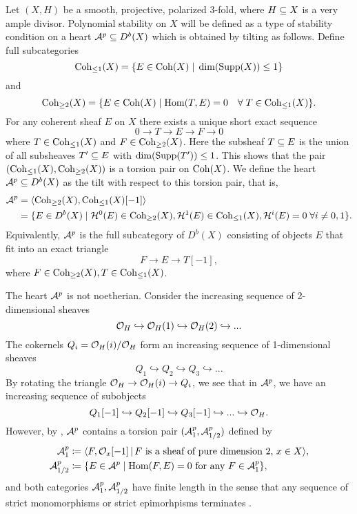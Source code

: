 Let $(X, H)$ be a smooth, projective, polarized 3-fold, where $H \subseteq X$ is a very ample divisor. Polynomial stability on $X$ will be defined as a type of stability condition on a heart $\mathcal{A}^p \subseteq D^b(X)$ which is obtained by tilting as follows. Define full subcategories
\[ \operatorname{\mathrm{Coh}}_{\le 1}(X) = \{ E \in \operatorname{\mathrm{Coh}}(X) \;|\; \dim(\operatorname{\mathrm{Supp}}(X)) \le 1 \} \]
and
\[ \operatorname{\mathrm{Coh}}_{\ge 2}(X) = \{ E \in \operatorname{\mathrm{Coh}}(X) \;|\; \mathrm{Hom}(T,E) = 0 \quad \forall \; T \in \operatorname{\mathrm{Coh}}_{\le 1}(X) \}. \]
For any coherent sheaf $E$ on $X$ there exists a unique short exact sequence
\[ 0 \to T \to E \to F \to 0 \]
where $T \in \operatorname{\mathrm{Coh}}_{\le 1}(X)$ and $F \in \operatorname{\mathrm{Coh}}_{\ge 2}(X)$. Here the subsheaf $T \subseteq E$ is the union of all subsheaves $T' \subseteq E$ with $\dim(\operatorname{\mathrm{Supp}}(T')) \le 1$. This shows that the pair $(\operatorname{\mathrm{Coh}}_{\le 1}(X), \operatorname{\mathrm{Coh}}_{\ge 2}(X))$ is a torsion pair on $\operatorname{\mathrm{Coh}}(X)$. We define the heart $\mathcal{A}^p \subseteq D^b(X)$ as the tilt with respect to this torsion pair, that is,
\begin{align}\label{perverseheart}
    \mathcal{A}^p & = \langle \operatorname{\mathrm{Coh}}_{\ge 2}(X), \operatorname{\mathrm{Coh}}_{\le 1}(X)[-1] \rangle \\
    & = \{ E \in D^b(X) \;|\; \mathcal{H}^0(E) \in \operatorname{\mathrm{Coh}}_{\ge 2}(X), \mathcal{H}^1(E) \in \operatorname{\mathrm{Coh}}_{\le 1}(X), \mathcal{H}^i(E) = 0 \;\forall i \neq 0,1 \}. \nonumber
\end{align}
Equivalently, $\mathcal{A}^p$ is the full subcategory of $D^b(X)$ consisting of objects $E$ that fit into an exact triangle
\[ F \to E \to T[-1], \]
where $F \in \operatorname{\mathrm{Coh}}_{\ge 2}(X), T \in \operatorname{\mathrm{Coh}}_{\le 1}(X)$.

\begin{rmk}
    The heart $\mathcal{A}^p$ is not noetherian. Consider the increasing sequence of 2-dimensional sheaves
    \[ \mathcal{O}_H \hookrightarrow \mathcal{O}_H(1) \hookrightarrow \mathcal{O}_H(2) \hookrightarrow ... \]
    The cokernels $Q_i = \mathcal{O}_H(i)/\mathcal{O}_H$ form an increasing sequence of 1-dimensional sheaves
    \[ Q_1 \hookrightarrow Q_2 \hookrightarrow Q_3 \hookrightarrow ... \]
    By rotating the triangle $\mathcal{O}_H \to \mathcal{O}_H(i) \to Q_i$, we see that in $\mathcal{A}^p$, we have an increasing sequence of subobjects
    \[ Q_1[-1] \hookrightarrow Q_2[-1] \hookrightarrow Q_3[-1] \hookrightarrow ... \hookrightarrow \mathcal{O}_H. \]
    However, by \cite[Lemma 2.16]{toda-limitstable}, $\mathcal{A}^p$ contains a torsion pair $(\mathcal{A}^p_1, \mathcal{A}^p_{1/2})$ defined by
    \begin{align*}
        \mathcal{A}^p_1 & \coloneqq \langle F, \mathcal{O}_x[-1] \,|\, F \text{ is a sheaf of pure dimension 2, } x \in X \rangle, \\
        \mathcal{A}^p_{1/2} & \coloneqq \{ E \in \mathcal{A}^p \;|\; \mathrm{Hom}(F, E) = 0 \text{ for any } F \in \mathcal{A}^p_1 \},
    \end{align*}
    and both categories $\mathcal{A}^p_1, \mathcal{A}^p_{1/2}$ have finite length in the sense that any sequence of strict monomorphisms or strict epimorhpisms terminates \cite[Lemma 2.19]{toda-limitstable}.
\end{rmk}

